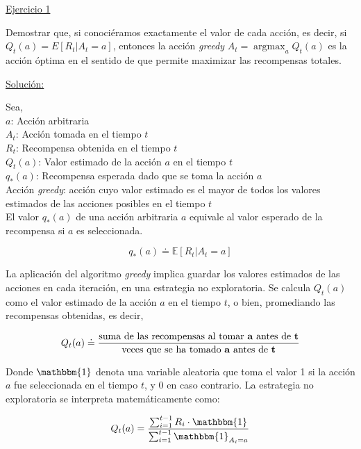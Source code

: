 \documentclass[12pt]{article}
\newlength\tindent
\renewcommand{\indent}{\hspace*{\tindent}}
\DeclareMathOperator*{\argmax}{argmax}
\begin{document}
    \indent\underline{Ejercicio 1}

    Demostrar que, si conociéramos exactamente el valor de cada acción, es decir, si $Q_{t} (a) = E \left[ R_{t} \big| A_{t}=a \right]$, entonces la acción \textit{greedy} $ A_{t} = \argmax_{a}Q_{t}(a) $ es la acción óptima en el sentido de que permite maximizar las recompensas totales.

    \indent\underline{Solución:}

    Sea,\\
    $a$: Acción arbitraria \\
    $A_{t}$: Acción tomada en el tiempo $t$ \\
    $R_{t}$: Recompensa obtenida en el tiempo $t$ \\
    $Q_{t}(a)$: Valor estimado de la acción $a$ en el tiempo $t$ \\
    $q_{*}(a)$: Recompensa esperada dado que se toma la acción $a$ \\
    Acción \textit{greedy}: acción cuyo valor estimado es el mayor de todos los valores estimados de las acciones posibles en el tiempo $t$ \\

    El valor $q_{*}(a)$ de una acción arbitraria $a$ equivale al valor esperado de la recompensa si $a$ es seleccionada.

    \[ q_{*}(a) \doteq \mathbb{E} \left[ R_{t} \big| A_{t}=a \right] \]

    La aplicación del algoritmo \textit{greedy} implica guardar los valores estimados de las acciones en cada iteración, en una estrategia no exploratoria.
    Se calcula $Q_{t}(a)$ como el valor estimado de la acción $a$ en el tiempo $t$, o bien, promediando las recompensas obtenidas, es decir,

    \begin{gather*}
        Q_{t}(a)
        \doteq
        \frac{\text{suma de las recompensas al tomar \textbf{a} antes de \textbf{t}}}
        {\text{veces que se ha tomado \textbf{a} antes de \textbf{t}}}
    \end{gather*}

    Donde $\mathbbm{1}$ denota una variable aleatoria que toma el valor 1 si la acción $a$ fue seleccionada en el tiempo $t$, y 0 en caso contrario\footnotemark.
    La estrategia no exploratoria se interpreta matemáticamente como:

    \[
        Q_t(a)= \frac{ \sum_{i=1}^{t-1} R_{i} \cdot \mathbbm{1} }{ \sum_{i=1}^{t-1} \mathbbm{1}_{A_{i}=a}}
    \]
\end{document}
